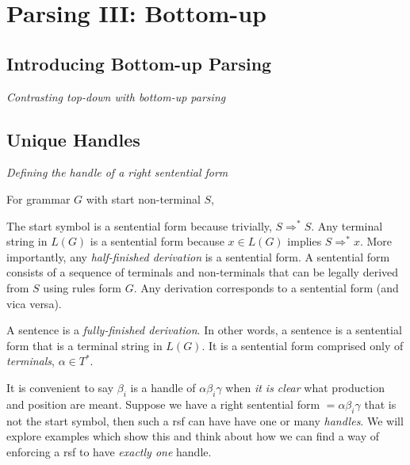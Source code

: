 
\chapter{Parsing III: Bottom-up}



\section{Introducing Bottom-up Parsing}

\textit{Contrasting top-down with bottom-up parsing }



\frmrule 




\section{Unique Handles}


\textit{Defining the handle of a right sentential form } 

For grammar $G$ with start non-terminal $S$, 

The start symbol is a sentential form because trivially, $S \Rightarrow^{*} S$. 
Any terminal string in $L(G)$ is a sentential form because $x \in L(G)$ implies $S \Rightarrow^{*} x$. 
More importantly, any \textit{half-finished derivation} is a sentential form. 
A sentential form consists of a sequence of terminals and non-terminals that can 
be legally derived from $S$ using rules form $G$. Any derivation corresponds to 
a sentential form (and vica versa). 


A sentence is a \textit{fully-finished derivation}. In other words, 
a sentence is a sentential form that is a terminal string in $L(G)$. It is a 
sentential form comprised only of \textit{terminals}, $\alpha \in T^{*}$.


\frmrule 


It is convenient to say $\beta_i$ is a handle of $\alpha \beta_i \gamma$ when 
\textit{it is clear} what production and position are meant. 
Suppose we have a right sentential form $= \alpha \beta_i \gamma$ that is not the start symbol,
then such a rsf can have have one or many \textit{handles}. 
We will explore examples which show this and think about how 
we can find a way of enforcing a rsf to have \textit{exactly one} handle. 


